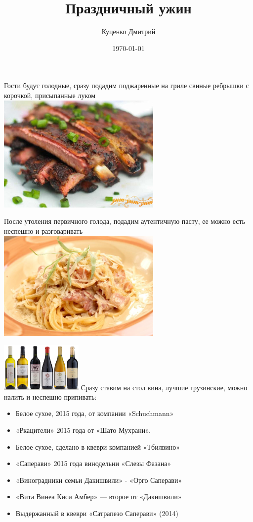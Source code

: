 \documentclass[t]{beamer}
\author{Куценко Дмитрий}
\title{Праздничный ужин}
\date{\today}
\begin{document}
\begin{frame}[plain]
    \titlepage
\end{frame}

\begin{frame}
    Гости будут голодные, сразу подадим поджаренные на гриле свиные ребрышки с корочкой, присыпанные луком \\
    \includegraphics[width=8cm]{6-rebra.jpg}
\end{frame}

\begin{frame}
    После утоления первичного голода, подадим аутентичную пасту, ее можно есть неспешно и разговаривать \\
    \includegraphics[width=8cm]{6-pasta.jpg}
\end{frame}

\begin{frame}
    \includegraphics[width=4cm]{6-wines.jpg}
    Сразу ставим на стол вина, лучшие грузинские, можно налить и неспешно припивать:
    \begin{itemize}
        \item<1-> Белое сухое, 2015 года, от компании «Schuchmann»
        \item<2-> «Ркацители» 2015 года от «Шато Мухрани».
        \item<3-> Белое сухое, сделано в квеври компанией «Тбилвино»
        \item<4-> «Саперави» 2015 года винодельни «Слезы Фазана»
        \item<5-> «Виноградники семьи Дакишвили» - «Орго Саперави»
        \item<6-> «Вита Винеа Киси Амбер» — второе от «Дакишвили»
        \item<7-> Выдержанный в квеври «Сатрапезо Саперави» (2014)
    \end{itemize}
\end{frame}
\end{document}
